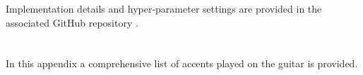 \documentclass[twoside,11pt]{article}
\begin{document}
Implementation details and hyper-parameter settings are provided in the associated GitHub repository \cite{SC0RE}.



\newpage

\appendix
\section{}
\label{app:A}



In this appendix a comprehensive list of accents played on the guitar is provided.
\end{document}
